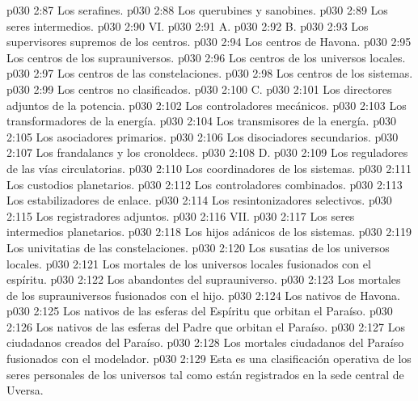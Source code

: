 \vs p030 2:87 Los serafines.
\vs p030 2:88 Los querubines y sanobines.
\vs p030 2:89 Los seres intermedios.
\vs p030 2:90 \pc VI. 
\vs p030 2:91 \pc A. 
\vs p030 2:92 \pc B. 
\vs p030 2:93 Los supervisores supremos de los centros.
\vs p030 2:94 Los centros de Havona.
\vs p030 2:95 Los centros de los suprauniversos.
\vs p030 2:96 Los centros de los universos locales.
\vs p030 2:97 Los centros de las constelaciones.
\vs p030 2:98 Los centros de los sistemas.
\vs p030 2:99 Los centros no clasificados.
\vs p030 2:100 \pc C. 
\vs p030 2:101 Los directores adjuntos de la potencia.
\vs p030 2:102 Los controladores mecánicos.
\vs p030 2:103 Los transformadores de la energía.
\vs p030 2:104 Los transmisores de la energía.
\vs p030 2:105 Los asociadores primarios.
\vs p030 2:106 Los disociadores secundarios.
\vs p030 2:107 Los frandalancs y los cronoldecs.
\vs p030 2:108 \pc D. 
\vs p030 2:109 Los reguladores de las vías circulatorias.
\vs p030 2:110 Los coordinadores de los sistemas.
\vs p030 2:111 Los custodios planetarios.
\vs p030 2:112 Los controladores combinados.
\vs p030 2:113 Los estabilizadores de enlace.
\vs p030 2:114 Los resintonizadores selectivos.
\vs p030 2:115 Los registradores adjuntos.
\vs p030 2:116 \pc VII. 
\vs p030 2:117 Los seres intermedios planetarios.
\vs p030 2:118 Los hijos adánicos de los sistemas.
\vs p030 2:119 Los univitatias de las constelaciones.
\vs p030 2:120 Los susatias de los universos locales.
\vs p030 2:121 Los mortales de los universos locales fusionados con el espíritu.
\vs p030 2:122 Los abandontes del suprauniverso.
\vs p030 2:123 Los mortales de los suprauniversos fusionados con el hijo.
\vs p030 2:124 Los nativos de Havona.
\vs p030 2:125 Los nativos de las esferas del Espíritu que orbitan el Paraíso.
\vs p030 2:126 Los nativos de las esferas del Padre que orbitan el Paraíso.
\vs p030 2:127 Los ciudadanos creados del Paraíso.
\vs p030 2:128 Los mortales ciudadanos del Paraíso fusionados con el modelador.
\vs p030 2:129 \pc Esta es una clasificación operativa de los seres personales de los universos tal como están registrados en la sede central de Uversa.

